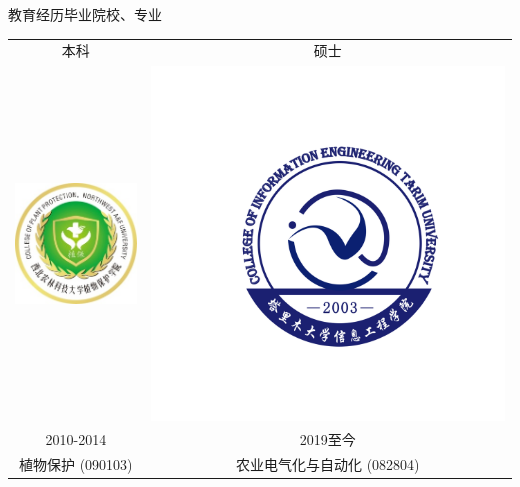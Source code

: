 \documentclass[xcolor=svgnames, t, aspectratio=169]{ctexbeamer}
\begin{document}
\begin{frame}{教育经历}{毕业院校、专业}
  \begin{table}
    \begin{tabular}{cc}
      本科                                       & 硕士                                                           \\
      \includegraphics[scale=1.15]{ppcnwafu.png} & \includegraphics[scale=0.5,trim=88 71 66 77,clip]{cietaru.png} \\
      2010{-}2014                                & 2019至今\\
      植物保护 (090103)                          & 农业电气化与自动化 (082804)
    \end{tabular}
  \end{table}
\end{frame}
\end{document}
